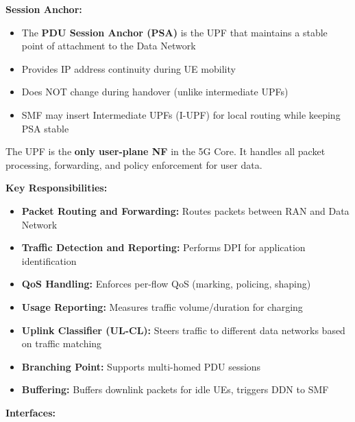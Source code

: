 \textbf{Session Anchor:}

\begin{itemize}
\tightlist
\item
  The \textbf{PDU Session Anchor (PSA)} is the UPF that maintains a stable point of attachment to the Data Network
\item
  Provides IP address continuity during UE mobility
\item
  Does NOT change during handover (unlike intermediate UPFs)
\item
  SMF may insert Intermediate UPFs (I-UPF) for local routing while keeping PSA stable
\end{itemize}


The UPF is the \textbf{only user-plane NF} in the 5G Core. It handles all packet processing, forwarding, and policy enforcement for user data.

\textbf{Key Responsibilities:}

\begin{itemize}
\tightlist
\item
  \textbf{Packet Routing and Forwarding:} Routes packets between RAN and Data Network
\item
  \textbf{Traffic Detection and Reporting:} Performs DPI for application identification
\item
  \textbf{QoS Handling:} Enforces per-flow QoS (marking, policing, shaping)
\item
  \textbf{Usage Reporting:} Measures traffic volume/\allowbreak{}duration for charging
\item
  \textbf{Uplink Classifier (UL-CL):} Steers traffic to different data networks based on traffic matching
\item
  \textbf{Branching Point:} Supports multi-homed PDU sessions
\item
  \textbf{Buffering:} Buffers downlink packets for idle UEs, triggers DDN to SMF
\end{itemize}


\textbf{Interfaces:}

